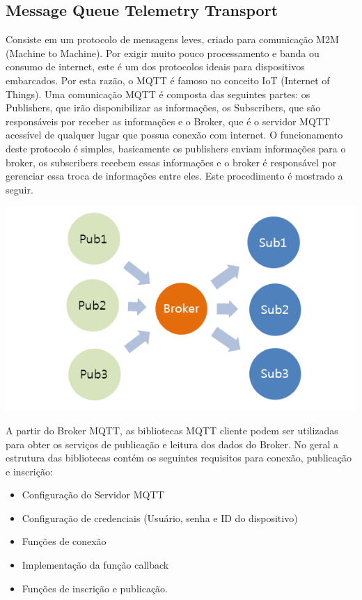 \subsection{Message Queue Telemetry Transport}
	Consiste em um protocolo de mensagens leves, criado para comunicação M2M (Machine to Machine). Por exigir muito pouco processamento e banda ou consumo de internet, este é um dos protocolos ideais para dispositivos embarcados. Por esta razão, o MQTT é famoso no conceito IoT (Internet of Things).
	Uma comunicação MQTT é composta das seguintes partes: os Publishers, que irão disponibilizar as informações, os Subscribers, que são responsáveis por receber as informações e o Broker, que é o servidor MQTT acessível de qualquer lugar que possua conexão com internet.
	O funcionamento deste protocolo é simples, basicamente os publishers enviam informações para o broker, os subscribers recebem essas informações e o broker é responsável por gerenciar essa troca de informações entre eles. Este procedimento é mostrado a seguir.
    \begin{center}
    	\includegraphics[scale=0.7]
        {figuras/MQTT-Funcionamento}
        \label{mqtt}
    \end{center}
    
	A partir do Broker MQTT, as bibliotecas MQTT cliente podem ser utilizadas para obter os serviços de publicação e leitura dos dados do Broker. No geral a estrutura das bibliotecas contém os seguintes requisitos para conexão, publicação e inscrição:  
    \begin{itemize}
    \item 
    	Configuração do Servidor MQTT
   	\item
    	Configuração de credenciais (Usuário, senha e ID do dispositivo)
    \item
   	 	Funções de conexão
    \item
   	 	Implementação da função callback
    \item
    	Funções de inscrição e publicação.        
    \end{itemize}
    
